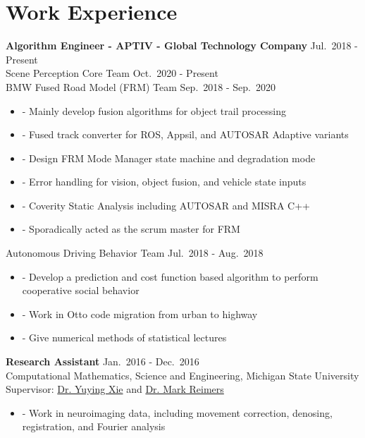 \documentclass[a4paper,10pt,dvipdfmx]{article}
\begin{document}
\section*{Work Experience}
\indent \textbf{Algorithm Engineer - APTIV - Global Technology Company} \hfill Jul.~2018 - Present\\
\indent Scene Perception Core Team \hfill Oct.~2020 - Present\\
\indent BMW Fused Road Model (FRM) Team \hfill Sep.~2018 - Sep.~2020
\begin{itemize}[noitemsep,nolistsep]
  \item[] - Mainly develop fusion algorithms for object trail processing
  \item[] - Fused track converter for ROS, Appsil, and AUTOSAR Adaptive variants
  \item[] - Design FRM Mode Manager state machine and degradation mode
  \item[] - Error handling for vision, object fusion, and vehicle state inputs
  \item[] - Coverity Static Analysis including AUTOSAR and MISRA C++
  \item[] - Sporadically acted as the scrum master for FRM
\end{itemize}

\indent Autonomous Driving Behavior Team \hfill Jul.~2018 - Aug.~2018
\begin{itemize}[noitemsep,nolistsep]
  \item[] - Develop a prediction and cost function based algorithm to perform cooperative social behavior
  \item[] - Work in Otto code migration from urban to highway
  \item[] - Give numerical methods of statistical lectures\\
\end{itemize}

\indent \textbf{Research Assistant} \hfill Jan.~2016 - Dec.~2016\\
\indent Computational Mathematics, Science and Engineering, Michigan State University\\
\indent Supervisor: \href{https://cmse.msu.edu/directory/faculty/yuying-xie/}{Dr. Yuying Xie} and \href{https://msu.edu/~reimersm/}{Dr. Mark Reimers}
\begin{itemize}[noitemsep,nolistsep]
  \item[] - Work in neuroimaging data, including movement correction, denosing, registration, and Fourier analysis\\
\end{itemize}
\end{document}
